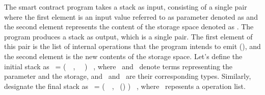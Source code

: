 \documentclass[a4paper,USenglish,cleveref, autoref, thm-restate]{lipics-v2021}
\begin{document}
The smart contract program takes a stack as input, consisting of a single pair where the first element is an input value referred to as parameter denoted as \VPAR and the second element represents the content of the storage space denoted as \VSTORAGE. The program produces a stack as output, which is a single pair. The first element of this pair is the list of internal operations that the program intends to emit (\VOPERATIONLIST), and the second element is the new contents of the storage space.  Let's define the initial stack as  \SINIT\   = (\KPAIR\ \VPAR\ \VSTORAGE, \TPAIR\ \TYF\ \TYS) \STACKCONCAT\ \EMPTYSTACK, where \VPAR\ and \VSTORAGE\ denote terms representing the parameter and the storage, and \TYF\ and \TYS\ are their corresponding types. Similarly, designate the final stack as \SFINAL\   = (\PAIR\ \VOPERATIONLIST\ \VSTORAGE, \TPAIR\ (\TOPERATIONLIST) \TYS) \STACKCONCAT\ \EMPTYSTACK, where \VOPERATIONLIST\ repesents a operation list.
\end{document}
